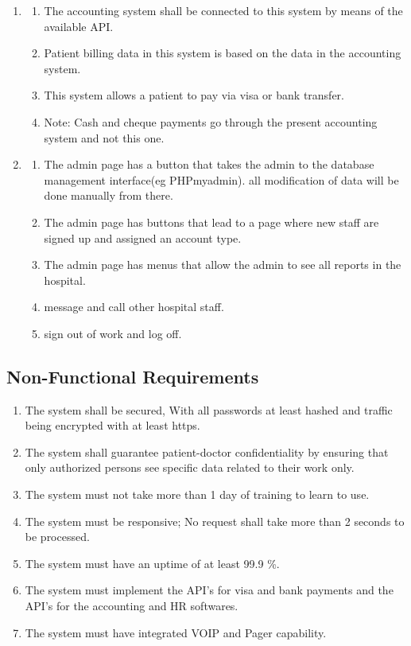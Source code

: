 \documentclass[14pt]{article}
\begin{document}
\begin{enumerate}
		 \item \begin{enumerate}
		\item The accounting system shall be connected to this system by means of the available API. 
		\item Patient billing data in this system is based on the data in the accounting system.
		\item This system allows a patient to pay via visa or bank transfer. 
		\item Note: Cash and cheque payments go through the present accounting system and not this one. 
		  \end{enumerate}
		  
		\item \begin{enumerate}
		\item The admin page has a button that takes the admin to the database management interface(eg PHPmyadmin).
		all modification of data will be done manually from there.
		\item The admin page has buttons that lead to a page where new staff are signed up and assigned an account type.
		\item The admin page has menus that allow the admin to see all reports in the hospital. 
		\item message and call other hospital staff.
		\item sign out of work and log off.
		  \end{enumerate}
		  
		
\end{enumerate}

\subsection{Non-Functional Requirements}
\begin{enumerate}
	\item The system shall be secured, With all passwords at least hashed and traffic being encrypted with at least https.
	\item The system shall guarantee patient-doctor confidentiality by ensuring that only authorized
	persons see specific data related to their work only.
	\item The system must not take more than 1 day of training to learn to use.
	\item The system must be responsive; No request shall take more than 2 seconds to be processed.
	\item The system must have an uptime of at least 99.9 \%.
	\item The system must implement the API's for visa and bank payments and the API's for the accounting and HR softwares.
	\item The system must have integrated VOIP and Pager capability. 
\end{enumerate}
\newpage
\end{document}
